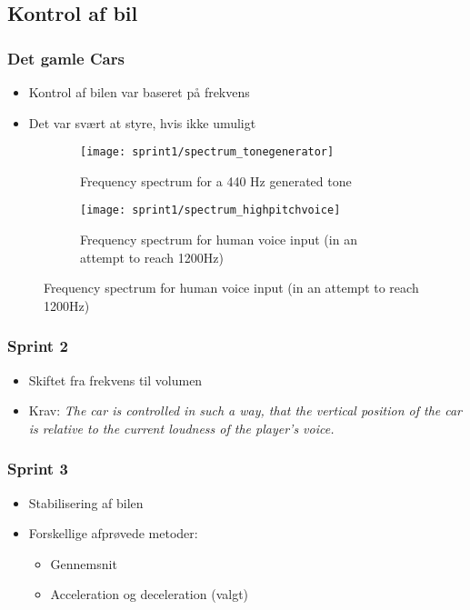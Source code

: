 \subsection{Kontrol af bil}
\begin{frame}
\frametitle{Det gamle Cars}
\begin{itemize}
\item Kontrol af bilen var baseret på frekvens
\item Det var svært at styre, hvis ikke umuligt
\end{itemize}
\begin{figure}[h]
\centering
\begin{subfigure}[t]{.45\textwidth}
\texttt{[image: sprint1/spectrum\_tonegenerator]}
\caption{Frequency spectrum for a 440 Hz generated tone}
\end{subfigure}
\begin{subfigure}[t]{.45\textwidth}
\texttt{[image: sprint1/spectrum\_highpitchvoice]}
\caption{Frequency spectrum for human voice input (in an attempt to reach 1200Hz)}
\end{subfigure}
\end{figure}
\end{frame}

\begin{frame}
\frametitle{Sprint 2}
\begin{itemize}
\item Skiftet fra frekvens til volumen
\item Krav: \textit{The car is controlled in such a way,
that the vertical position of the car is relative
to the current loudness of the player's voice.}
\end{itemize}
\begin{figure}
\centering

\end{figure}
\end{frame}

\begin{frame}
\frametitle{Sprint 3}
\begin{itemize}
\item Stabilisering af bilen
\item Forskellige afprøvede metoder:
\begin{itemize}
\item Gennemsnit
\item Acceleration og deceleration (valgt)
\end{itemize}
\end{itemize}
\end{frame}


